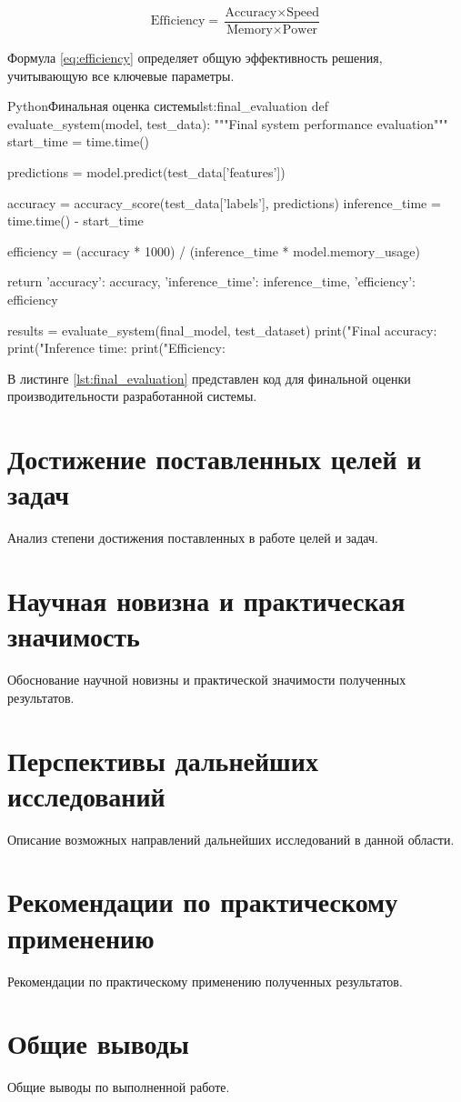 \begin{equation}
\text{Efficiency} = \frac{\text{Accuracy} \times \text{Speed}}{\text{Memory} \times \text{Power}}
\label{eq:efficiency}
\end{equation}

Формула \ref{eq:efficiency} определяет общую эффективность решения, учитывающую все ключевые параметры.

\begin{CodeBlock}{Python}{Финальная оценка системы}{lst:final_evaluation}
def evaluate_system(model, test_data):
    """Final system performance evaluation"""
    start_time = time.time()
    
    predictions = model.predict(test_data['features'])
    
    accuracy = accuracy_score(test_data['labels'], predictions)
    inference_time = time.time() - start_time
    
    efficiency = (accuracy * 1000) / (inference_time * model.memory_usage)
    
    return {
        'accuracy': accuracy,
        'inference_time': inference_time,
        'efficiency': efficiency
    }

results = evaluate_system(final_model, test_dataset)
print("Final accuracy: %
print("Inference time: %
print("Efficiency: %
\end{CodeBlock}

В листинге \ref{lst:final_evaluation} представлен код для финальной оценки производительности разработанной системы.

\section{Достижение поставленных целей и задач}

Анализ степени достижения поставленных в работе целей и задач.

\section{Научная новизна и практическая значимость}

Обоснование научной новизны и практической значимости полученных результатов.

\section{Перспективы дальнейших исследований}

Описание возможных направлений дальнейших исследований в данной области.

\section{Рекомендации по практическому применению}

Рекомендации по практическому применению полученных результатов.

\section{Общие выводы}

Общие выводы по выполненной работе.
